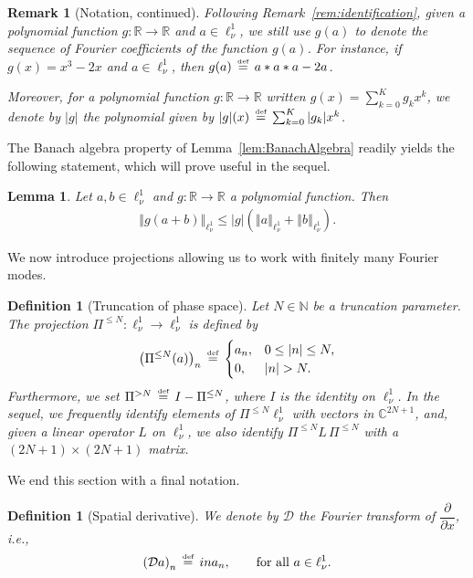 \documentclass[10pt,a4paper]{article}
\theoremstyle{plain}
\newtheorem{lemma}[theorem]{Lemma}
\newtheorem{remark}[theorem]{Remark}
\newtheorem{definition}[theorem]{Definition}
\newcommand{\RR}{\mathbb R}
\newcommand{\CC}{\mathbb C}
\newcommand{\NN}{\mathbb N}
\newcommand{\D}{\mathcal{D}}
\newcommand{\1}{\mathbf{1}}
\newcommand{\bydef}{\,\stackrel{\mbox{\tiny\textnormal{\raisebox{0ex}[0ex][0ex]{def}}}}{=}\,}
\begin{document}
\begin{remark}[Notation, continued]
\label{rem:absg}
Following Remark~\ref{rem:identification}, given a polynomial function $g:\RR\to\RR$ and $a\in\ell^1_\nu$, we still use $g(a)$ to denote the sequence of Fourier coefficients of the function $g(a)$. For instance, if $g(x) = x^3 - 2x$ and $a\in\ell^1_\nu$, then $g(a) \bydef a\ast a\ast a - 2a$. 

Moreover, for a polynomial function $g:\RR\to\RR$ written
$g(x) = \sum_{k=0}^K g_k x^k$, 
we denote by $\vert g\vert$ the polynomial given by
$\vert g\vert (x) \bydef \sum_{k=0}^K \vert g_k\vert x^k$.
\end{remark}

The Banach algebra property of Lemma~\ref{lem:BanachAlgebra} readily yields the following statement, which will prove useful in the sequel.
\begin{lemma}
\label{lem:abs_pol}
Let $a,b\in\ell^1_\nu$ and $g:\RR\to\RR$ a polynomial function. Then
\begin{align*}
\left\Vert g(a+b)\right\Vert_{\ell^1_\nu} \leq  \vert g\vert \left(\left\Vert a\right\Vert_{\ell^1_\nu} + \left\Vert b\right\Vert_{\ell^1_\nu}\right).
\end{align*}
\end{lemma}

We now introduce projections allowing us to work with finitely many Fourier modes.
\begin{definition}[Truncation of phase space]
	Let $N \in \NN$ be a truncation parameter. 
	The projection $\Pi^{\leq N} : \ell^1_\nu \rightarrow \ell^1_\nu$ is defined by
	\begin{align*}
		\left( \Pi^{\leq N} ( a ) \right)_{n} \bydef  
		\begin{cases}
			a_{n}, &  0 \leq \vert n\vert \leq N, \\
			0, & \vert n\vert > N. 
		\end{cases}
	\end{align*} 
	Furthermore, we set $\Pi^{>N} \bydef  I - \Pi^{\leq N}$, where $I$ is the identity on $\ell^1_\nu$. In the sequel, we frequently identify elements of $\Pi^{\leq N}\ell^1_\nu$ with vectors in $\CC^{2N+1}$, and, given a linear operator $L$ on $\ell^1_\nu$, we also identify $\Pi^{\leq N} L\, \Pi^{\leq N}$ with a $(2N+1)\times(2N+1)$ matrix. 
\end{definition}
We end this section with a final notation.
\begin{definition}[Spatial derivative]
We denote by $\D$ the Fourier transform of $\dfrac{\partial}{\partial x}$, i.e.,
\begin{equation*}
\left(\D a\right)_n \bydef  in a_n, \qquad\text{for all }a\in\ell^1_\nu.
\end{equation*}
\end{definition}
\end{document}
